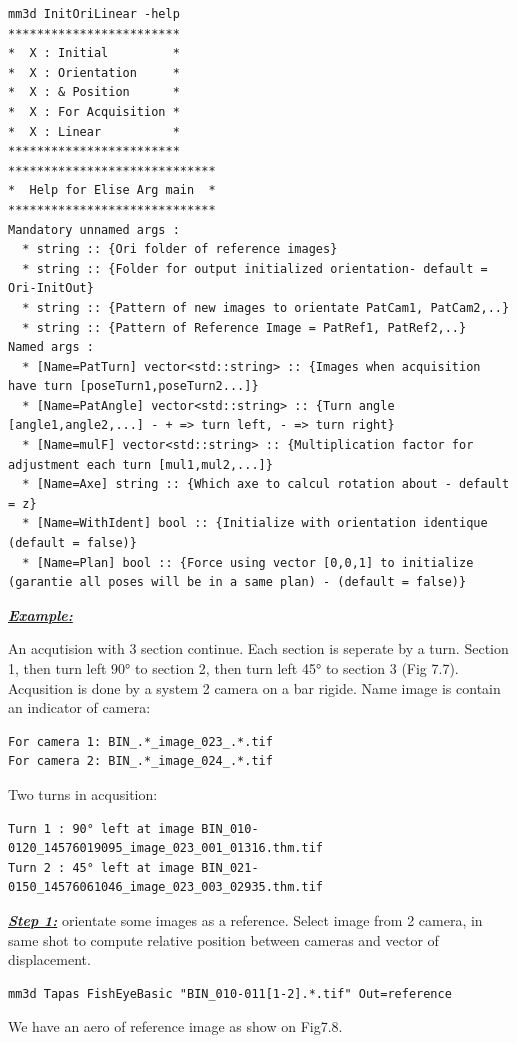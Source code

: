 \begin{verbatim}
mm3d InitOriLinear -help
************************
*  X : Initial         *
*  X : Orientation     *
*  X : & Position      *
*  X : For Acquisition *
*  X : Linear          *
************************
*****************************
*  Help for Elise Arg main  *
*****************************
Mandatory unnamed args : 
  * string :: {Ori folder of reference images}
  * string :: {Folder for output initialized orientation- default = Ori-InitOut}
  * string :: {Pattern of new images to orientate PatCam1, PatCam2,..}
  * string :: {Pattern of Reference Image = PatRef1, PatRef2,..}
Named args : 
  * [Name=PatTurn] vector<std::string> :: {Images when acquisition have turn [poseTurn1,poseTurn2...]}
  * [Name=PatAngle] vector<std::string> :: {Turn angle [angle1,angle2,...] - + => turn left, - => turn right}
  * [Name=mulF] vector<std::string> :: {Multiplication factor for adjustment each turn [mul1,mul2,...]}
  * [Name=Axe] string :: {Which axe to calcul rotation about - default = z}
  * [Name=WithIdent] bool :: {Initialize with orientation identique (default = false)}
  * [Name=Plan] bool :: {Force using vector [0,0,1] to initialize (garantie all poses will be in a same plan) - (default = false)}
\end{verbatim}

\underline{\textit{\textbf{Example:}}}

An acqutision with 3 section continue. Each section is seperate by a turn. Section 1, then turn left 90° to section 2, then turn left 45° to section 3 (Fig 7.7). Acqusition is done by a system 2 camera on a bar rigide.
Name image is contain an indicator of camera:
\begin{verbatim}
For camera 1: BIN_.*_image_023_.*.tif
For camera 2: BIN_.*_image_024_.*.tif
\end{verbatim}
Two turns in acqusition: 
\begin{verbatim}
Turn 1 : 90° left at image BIN_010-0120_14576019095_image_023_001_01316.thm.tif
Turn 2 : 45° left at image BIN_021-0150_14576061046_image_023_003_02935.thm.tif
\end{verbatim}

\underline{\textit{\textbf{Step 1:}}} orientate some images as a reference. Select image from 2 camera, in same shot to compute relative position between cameras and vector of displacement.
\begin{verbatim}
mm3d Tapas FishEyeBasic "BIN_010-011[1-2].*.tif" Out=reference
\end{verbatim}
We have an aero of reference image as show on Fig7.8.

